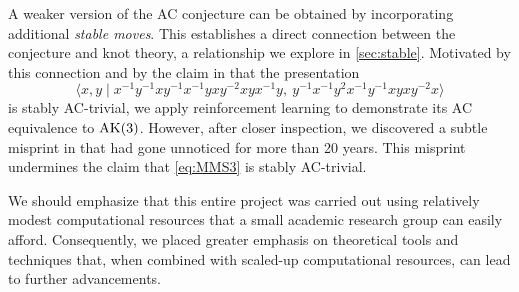 \medskip
A weaker version of the AC conjecture can be obtained by incorporating additional \textit{stable moves}. This establishes a direct connection between the conjecture and knot theory, a relationship we explore in \cref{sec:stable}. Motivated by this connection and by the claim in \cite{MMS} that the presentation
\begin{equation}\label{eq:MMS3}
	\langle x, y \mid
	x^{-1}y^{-1}xy^{-1}x^{-1}yxy^{-2}xyx^{-1}y, \
	y^{-1}x^{-1}y^2x^{-1}y^{-1}xyxy^{-2}x \rangle
\end{equation}
is stably AC-trivial, we apply reinforcement learning to demonstrate its AC equivalence to $\text{AK}(3)$.
However, after closer inspection, we discovered a subtle misprint in \cite[p.10]{MMS} that had gone unnoticed for more than 20 years. This misprint undermines the claim that \eqref{eq:MMS3} is stably AC-trivial.

\medskip
We should emphasize that this entire project was carried out using relatively modest computational resources that a small academic research group can easily afford. Consequently, we placed greater emphasis on theoretical tools and techniques that, when combined with scaled-up computational resources, can lead to further advancements.

